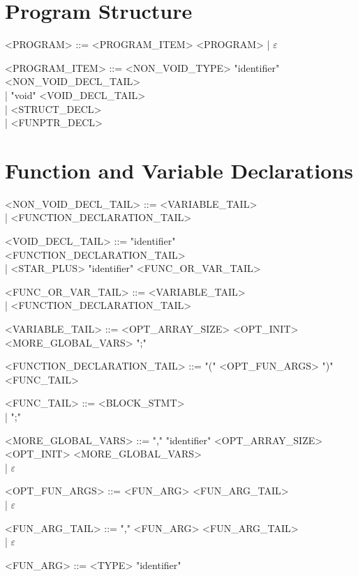 \section{Program Structure}
\begin{grammar}
      <PROGRAM> ::= <PROGRAM\_ITEM> <PROGRAM> | $\varepsilon$

      <PROGRAM\_ITEM> ::= <NON\_VOID\_TYPE> "identifier" <NON\_VOID\_DECL\_TAIL> \\
      | "void" <VOID\_DECL\_TAIL> \\
      | <STRUCT\_DECL> \\
      | <FUNPTR\_DECL>
\end{grammar}

\section{Function and Variable Declarations}
\begin{grammar}
      <NON\_VOID\_DECL\_TAIL> ::= <VARIABLE\_TAIL> \\
      | <FUNCTION\_DECLARATION\_TAIL>

      <VOID\_DECL\_TAIL> ::= "identifier" <FUNCTION\_DECLARATION\_TAIL> \\
      | <STAR\_PLUS> "identifier" <FUNC\_OR\_VAR\_TAIL>

      <FUNC\_OR\_VAR\_TAIL> ::= <VARIABLE\_TAIL> \\
      | <FUNCTION\_DECLARATION\_TAIL>

      <VARIABLE\_TAIL> ::= <OPT\_ARRAY\_SIZE> <OPT\_INIT> <MORE\_GLOBAL\_VARS> ";"

      <FUNCTION\_DECLARATION\_TAIL> ::= "(" <OPT\_FUN\_ARGS> ")" <FUNC\_TAIL>

      <FUNC\_TAIL> ::= <BLOCK\_STMT> \\
      | ";"

      <MORE\_GLOBAL\_VARS> ::= "," "identifier" <OPT\_ARRAY\_SIZE> <OPT\_INIT> <MORE\_GLOBAL\_VARS> \\
      | $\varepsilon$

      <OPT\_FUN\_ARGS> ::= <FUN\_ARG> <FUN\_ARG\_TAIL> \\
      | $\varepsilon$

      <FUN\_ARG\_TAIL> ::= "," <FUN\_ARG> <FUN\_ARG\_TAIL> \\
      | $\varepsilon$

      <FUN\_ARG> ::= <TYPE> "identifier"
\end{grammar}

